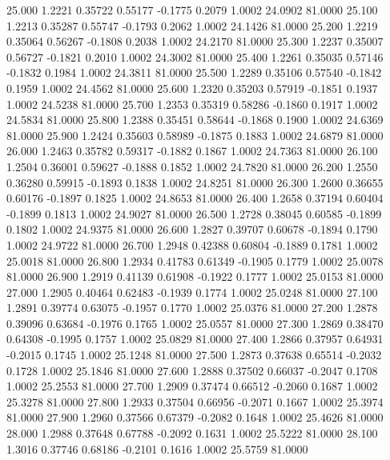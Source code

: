   25.000   1.2221   0.35722   0.55177  -0.1775   0.2079   1.0002  24.0902  81.0000
  25.100   1.2213   0.35287   0.55747  -0.1793   0.2062   1.0002  24.1426  81.0000
  25.200   1.2219   0.35064   0.56267  -0.1808   0.2038   1.0002  24.2170  81.0000
  25.300   1.2237   0.35007   0.56727  -0.1821   0.2010   1.0002  24.3002  81.0000
  25.400   1.2261   0.35035   0.57146  -0.1832   0.1984   1.0002  24.3811  81.0000
  25.500   1.2289   0.35106   0.57540  -0.1842   0.1959   1.0002  24.4562  81.0000
  25.600   1.2320   0.35203   0.57919  -0.1851   0.1937   1.0002  24.5238  81.0000
  25.700   1.2353   0.35319   0.58286  -0.1860   0.1917   1.0002  24.5834  81.0000
  25.800   1.2388   0.35451   0.58644  -0.1868   0.1900   1.0002  24.6369  81.0000
  25.900   1.2424   0.35603   0.58989  -0.1875   0.1883   1.0002  24.6879  81.0000
  26.000   1.2463   0.35782   0.59317  -0.1882   0.1867   1.0002  24.7363  81.0000
  26.100   1.2504   0.36001   0.59627  -0.1888   0.1852   1.0002  24.7820  81.0000
  26.200   1.2550   0.36280   0.59915  -0.1893   0.1838   1.0002  24.8251  81.0000
  26.300   1.2600   0.36655   0.60176  -0.1897   0.1825   1.0002  24.8653  81.0000
  26.400   1.2658   0.37194   0.60404  -0.1899   0.1813   1.0002  24.9027  81.0000
  26.500   1.2728   0.38045   0.60585  -0.1899   0.1802   1.0002  24.9375  81.0000
  26.600   1.2827   0.39707   0.60678  -0.1894   0.1790   1.0002  24.9722  81.0000
  26.700   1.2948   0.42388   0.60804  -0.1889   0.1781   1.0002  25.0018  81.0000
  26.800   1.2934   0.41783   0.61349  -0.1905   0.1779   1.0002  25.0078  81.0000
  26.900   1.2919   0.41139   0.61908  -0.1922   0.1777   1.0002  25.0153  81.0000
  27.000   1.2905   0.40464   0.62483  -0.1939   0.1774   1.0002  25.0248  81.0000
  27.100   1.2891   0.39774   0.63075  -0.1957   0.1770   1.0002  25.0376  81.0000
  27.200   1.2878   0.39096   0.63684  -0.1976   0.1765   1.0002  25.0557  81.0000
  27.300   1.2869   0.38470   0.64308  -0.1995   0.1757   1.0002  25.0829  81.0000
  27.400   1.2866   0.37957   0.64931  -0.2015   0.1745   1.0002  25.1248  81.0000
  27.500   1.2873   0.37638   0.65514  -0.2032   0.1728   1.0002  25.1846  81.0000
  27.600   1.2888   0.37502   0.66037  -0.2047   0.1708   1.0002  25.2553  81.0000
  27.700   1.2909   0.37474   0.66512  -0.2060   0.1687   1.0002  25.3278  81.0000
  27.800   1.2933   0.37504   0.66956  -0.2071   0.1667   1.0002  25.3974  81.0000
  27.900   1.2960   0.37566   0.67379  -0.2082   0.1648   1.0002  25.4626  81.0000
  28.000   1.2988   0.37648   0.67788  -0.2092   0.1631   1.0002  25.5222  81.0000
  28.100   1.3016   0.37746   0.68186  -0.2101   0.1616   1.0002  25.5759  81.0000
